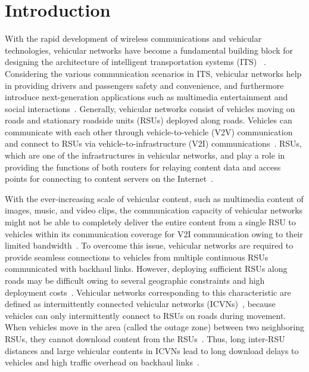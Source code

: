 \documentclass[electronics,aricle,accept,pdftex,moreauthors]{Definitions/mdpi}
\begin{document}
\section{Introduction}
With the rapid development of wireless communications and vehicular technologies, vehicular networks have become a fundamental building block for designing the architecture of intelligent transportation systems (ITS) ~\cite{Karagiannis2011Vehicular, Awang2017, Shahwani2021, An2016Sec, Lin2022Ref, Lin2021Sup, Lin2022SLN}.
Considering the various communication scenarios in ITS, vehicular networks help in providing drivers and passengers safety and convenience, and furthermore introduce next-generation applications such as multimedia entertainment and social interactions~\cite{Euisin2014, Zhang2018, Khelifi2020}.
Generally, vehicular networks consist of vehicles moving on roads and stationary roadside units (RSUs) deployed along roads.
Vehicles can communicate with each other through vehicle-to-vehicle (V2V) communication and connect to RSUs via vehicle-to-infrastructure (V2I) communications~\cite{Cheng2015, Wang2016, Lopes2019, Wang2019, Ko2021, Haung2021}.
RSUs, {which} %
 are one of the infrastructures in vehicular networks, and play a role in providing the functions of both routers for relaying content data and access points for connecting to content servers on the Internet~\cite{Reis2014Deploying, Kim2017}.

With the ever-increasing scale of vehicular content, such as multimedia content of images, music, and video clips, the communication capacity of vehicular networks might not be able to completely deliver the entire content from a single RSU to vehicles within its communication coverage for V2I communication owing to their limited bandwidth~\cite{Su2017NextGeneration, Rao2013Proactive}.
To overcome this issue, vehicular networks are required to provide seamless connections to vehicles from multiple continuous RSUs communicated with backhaul links. However, deploying sufficient RSUs along roads may be difficult owing to several geographic constraints and high deployment costs~\cite{Kim2017}.
Vehicular networks corresponding to this characteristic are defined as intermittently connected vehicular networks (ICVNs)~\cite{Wang2017, Suthaputchakun2018}, because vehicles can only intermittently connect to RSUs on roads during movement. When vehicles move in the area (called the outage zone) between two neighboring RSUs, they cannot download content from the RSUs~\cite{Wu2013Adaptive}. 
Thus, long inter-RSU distances and large vehicular contents in ICVNs lead to long download delays to vehicles and high traffic overhead on backhaul links~\cite{Zhou2019}.
\end{document}
